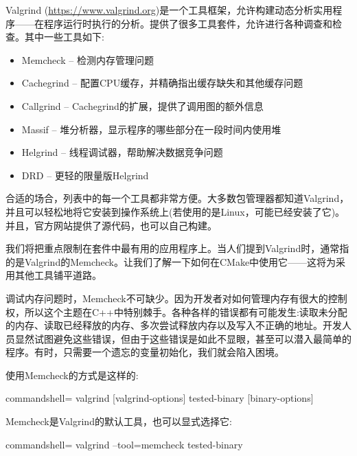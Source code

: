 
Valgrind (\url{https://www.valgrind.org})是一个工具框架，允许构建动态分析实用程序——在程序运行时执行的分析。提供了很多工具套件，允许进行各种调查和检查。其中一些工具如下:

\begin{itemize}
\item 
Memcheck – 检测内存管理问题

\item 
Cachegrind – 配置CPU缓存，并精确指出缓存缺失和其他缓存问题

\item 
Callgrind – Cachegrind的扩展，提供了调用图的额外信息

\item 
Massif – 堆分析器，显示程序的哪些部分在一段时间内使用堆

\item 
Helgrind – 线程调试器，帮助解决数据竞争问题

\item 
DRD – 更轻的限量版Helgrind
\end{itemize}

合适的场合，列表中的每一个工具都非常方便。大多数包管理器都知道Valgrind，并且可以轻松地将它安装到操作系统上(若使用的是Linux，可能已经安装了它)。并且，官方网站提供了源代码，也可以自己构建。

我们将把重点限制在套件中最有用的应用程序上。当人们提到Valgrind时，通常指的是Valgrind的Memcheck。让我们了解一下如何在CMake中使用它——这将为采用其他工具铺平道路。


调试内存问题时，Memcheck不可缺少。因为开发者对如何管理内存有很大的控制权，所以这个主题在C++中特别棘手。各种各样的错误都有可能发生:读取未分配的内存、读取已经释放的内存、多次尝试释放内存以及写入不正确的地址。开发人员显然试图避免这些错误，但由于这些错误是如此不显眼，甚至可以潜入最简单的程序。有时，只需要一个遗忘的变量初始化，我们就会陷入困境。

使用Memcheck的方式是这样的:

\begin{tcblisting}{commandshell={}}
valgrind [valgrind-options] tested-binary [binary-options]
\end{tcblisting}

Memcheck是Valgrind的默认工具，也可以显式选择它:

\begin{tcblisting}{commandshell={}}
valgrind --tool=memcheck tested-binary
\end{tcblisting}

